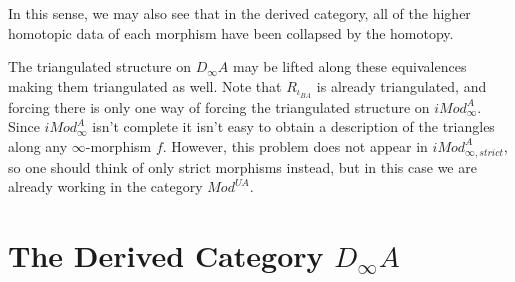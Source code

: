 \documentclass[../thesis.tex]{subfiles}
\begin{document}
            In this sense, we may also see that in the derived category, all of the higher homotopic data of each morphism have been collapsed by the homotopy.

            The triangulated structure on $D_\infty A$ may be lifted along these equivalences making them triangulated as well. Note that $R_{\iota_{BA}}$ is already triangulated, and forcing there is only one way of forcing the triangulated structure on $iMod_\infty^A$. Since $iMod_{\infty}^A$ isn't complete it isn't easy to obtain a description of the triangles along any $\infty$-morphism $f$. However, this problem does not appear in $iMod_{\infty, strict}^A$, so one should think of only strict morphisms instead, but in this case we are already working in the category $Mod^{UA}$. 
    \section{The Derived Category $D_\infty A$}
\end{document}

